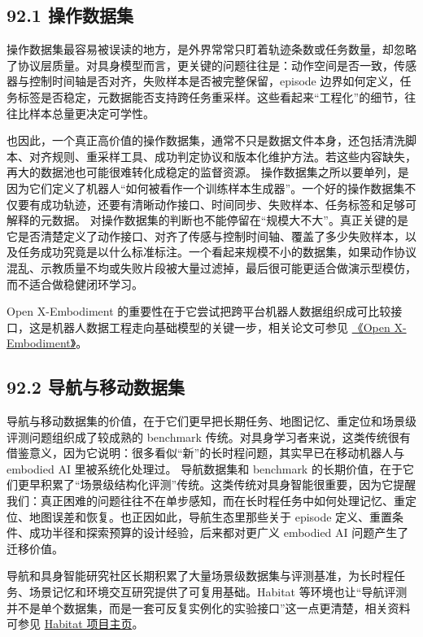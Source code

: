 \subsection*{92.1 操作数据集}


操作数据集最容易被误读的地方，是外界常常只盯着轨迹条数或任务数量，却忽略了协议层质量。对具身模型而言，更关键的问题往往是：动作空间是否一致，传感器与控制时间轴是否对齐，失败样本是否被完整保留，episode 边界如何定义，任务标签是否稳定，元数据能否支持跨任务重采样。这些看起来“工程化”的细节，往往比样本总量更决定可学性。

也因此，一个真正高价值的操作数据集，通常不只是数据文件本身，还包括清洗脚本、对齐规则、重采样工具、成功判定协议和版本化维护方法。若这些内容缺失，再大的数据池也可能很难转化成稳定的监督资源。 操作数据集之所以要单列，是因为它们定义了机器人“如何被看作一个训练样本生成器”。一个好的操作数据集不仅要有成功轨迹，还要有清晰动作接口、时间同步、失败样本、任务标签和足够可解释的元数据。 对操作数据集的判断也不能停留在“规模大不大”。真正关键的是它是否清楚定义了动作接口、对齐了传感与控制时间轴、覆盖了多少失败样本，以及任务成功究竟是以什么标准标注。一个看起来规模不小的数据集，如果动作协议混乱、示教质量不均或失败片段被大量过滤掉，最后很可能更适合做演示型模仿，而不适合做稳健闭环学习。

Open X-Embodiment 的重要性在于它尝试把跨平台机器人数据组织成可比较接口，这是机器人数据工程走向基础模型的关键一步，相关论文可参见 \href{https://arxiv.org/abs/2310.08864}{《Open X-Embodiment》}。

\subsection*{92.2 导航与移动数据集}


导航与移动数据集的价值，在于它们更早把长期任务、地图记忆、重定位和场景级评测问题组织成了较成熟的 benchmark 传统。对具身学习者来说，这类传统很有借鉴意义，因为它说明：很多看似“新”的长时程问题，其实早已在移动机器人与 embodied AI 里被系统化处理过。 导航数据集和 benchmark 的长期价值，在于它们更早积累了“场景级结构化评测”传统。这类传统对具身智能很重要，因为它提醒我们：真正困难的问题往往不在单步感知，而在长时程任务中如何处理记忆、重定位、地图误差和恢复。也正因如此，导航生态里那些关于 episode 定义、重置条件、成功半径和探索预算的设计经验，后来都对更广义 embodied AI 问题产生了迁移价值。

导航和具身智能研究社区长期积累了大量场景级数据集与评测基准，为长时程任务、场景记忆和环境交互研究提供了可复用基础。Habitat 等环境也让“导航评测并不是单个数据集，而是一套可反复实例化的实验接口”这一点更清楚，相关资料可参见 \href{https://aihabitat.org/}{Habitat 项目主页}。

